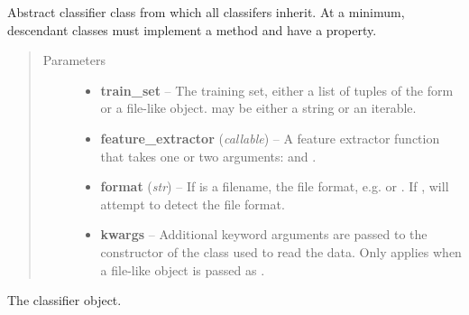 \documentclass[letterpaper,10pt,english]{sphinxmanual}
\begin{document}
\begin{fulllineitems}
\label{api_reference:textblob.classifiers.BaseClassifier}
Abstract classifier class from which all classifers inherit. At a
minimum, descendant classes must implement a  method and have
a  property.
\begin{quote}\begin{description}
\item[{Parameters}] \leavevmode\begin{itemize}
\item {} 
\textbf{train\_set} -- The training set, either a list of tuples of the form
 or a file-like object.  may be either
a string or an iterable.

\item {} 
\textbf{feature\_extractor} (\emph{callable}) -- A feature extractor function that takes one or
two arguments:  and .

\item {} 
\textbf{format} (\emph{str}) -- If  is a filename, the file format, e.g.
 or . If , will attempt to detect the
file format.

\item {} 
\textbf{kwargs} -- Additional keyword arguments are passed to the constructor
of the {\hyperref[api_reference:textblob.formats.BaseFormat]{}} class used to
read the data. Only applies when a file-like object is passed as
.

\end{itemize}

\end{description}\end{quote}


\begin{fulllineitems}
\label{api_reference:textblob.classifiers.BaseClassifier.classifier}
The classifier object.

\end{fulllineitems}


\end{fulllineitems}
\end{document}

